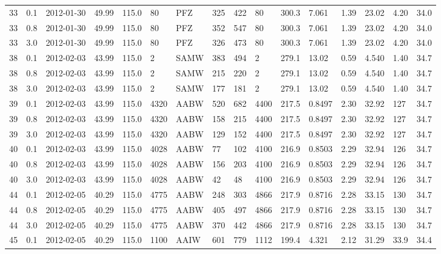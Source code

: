 {\begin{landscape}
\begin{longtable}{llllllllllllllll}
33 & 0.1 & 2012-01-30 & \textminus{}49.99 & 115.0 & 80 & PFZ & 325 & 422 & 80 & 300.3 & 7.061 & 1.39 & 23.02 & 4.20 & 34.0\\
33 & 0.8 & 2012-01-30 & \textminus{}49.99 & 115.0 & 80 & PFZ & 352 & 547 & 80 & 300.3 & 7.061 & 1.39 & 23.02 & 4.20 & 34.0\\
33 & 3.0 & 2012-01-30 & \textminus{}49.99 & 115.0 & 80 & PFZ & 326 & 473 & 80 & 300.3 & 7.061 & 1.39 & 23.02 & 4.20 & 34.0\\
38 & 0.1 & 2012-02-03 & \textminus{}43.99 & 115.0 & 2 & SAMW & 383 & 494 & 2 & 279.1 & 13.02 & 0.59 & 4.540 & 1.40 & 34.7\\
38 & 0.8 & 2012-02-03 & \textminus{}43.99 & 115.0 & 2 & SAMW & 215 & 220 & 2 & 279.1 & 13.02 & 0.59 & 4.540 & 1.40 & 34.7\\
38 & 3.0 & 2012-02-03 & \textminus{}43.99 & 115.0 & 2 & SAMW & 177 & 181 & 2 & 279.1 & 13.02 & 0.59 & 4.540 & 1.40 & 34.7\\
39 & 0.1 & 2012-02-03 & \textminus{}43.99 & 115.0 & 4320 & AABW & 520 & 682 & 4400 & 217.5 & 0.8497 & 2.30 & 32.92 & 127 & 34.7\\
39 & 0.8 & 2012-02-03 & \textminus{}43.99 & 115.0 & 4320 & AABW & 158 & 215 & 4400 & 217.5 & 0.8497 & 2.30 & 32.92 & 127 & 34.7\\
39 & 3.0 & 2012-02-03 & \textminus{}43.99 & 115.0 & 4320 & AABW & 129 & 152 & 4400 & 217.5 & 0.8497 & 2.30 & 32.92 & 127 & 34.7\\
40 & 0.1 & 2012-02-03 & \textminus{}43.99 & 115.0 & 4028 & AABW & 77 & 102 & 4100 & 216.9 & 0.8503 & 2.29 & 32.94 & 126 & 34.7\\
40 & 0.8 & 2012-02-03 & \textminus{}43.99 & 115.0 & 4028 & AABW & 156 & 203 & 4100 & 216.9 & 0.8503 & 2.29 & 32.94 & 126 & 34.7\\
40 & 3.0 & 2012-02-03 & \textminus{}43.99 & 115.0 & 4028 & AABW & 42 & 48 & 4100 & 216.9 & 0.8503 & 2.29 & 32.94 & 126 & 34.7\\
44 & 0.1 & 2012-02-05 & \textminus{}40.29 & 115.0 & 4775 & AABW & 248 & 303 & 4866 & 217.9 & 0.8716 & 2.28 & 33.15 & 130 & 34.7\\
44 & 0.8 & 2012-02-05 & \textminus{}40.29 & 115.0 & 4775 & AABW & 405 & 497 & 4866 & 217.9 & 0.8716 & 2.28 & 33.15 & 130 & 34.7\\
44 & 3.0 & 2012-02-05 & \textminus{}40.29 & 115.0 & 4775 & AABW & 370 & 442 & 4866 & 217.9 & 0.8716 & 2.28 & 33.15 & 130 & 34.7\\
45 & 0.1 & 2012-02-05 & \textminus{}40.29 & 115.0 & 1100 & AAIW & 601 & 779 & 1112 & 199.4 & 4.321 & 2.12 & 31.29 & 33.9 & 34.4\\

\end{longtable}
\end{landscape}}
